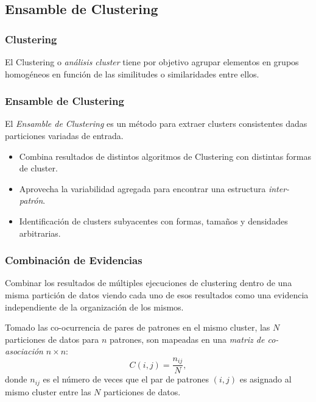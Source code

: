 \subsection{Ensamble de Clustering}
\begin{frame}
	\frametitle{Clustering}
	\centering
	El Clustering o \textit{análisis cluster} tiene por objetivo agrupar elementos en grupos homogéneos en función de las similitudes o similaridades entre ellos.
\end{frame}

\begin{frame}
	\frametitle{Ensamble de Clustering}
	\centering
	El \textit{Ensamble de Clustering} es un método para extraer clusters consistentes dadas particiones variadas de entrada.

 	\bigskip

	\begin{itemize}
		\item Combina resultados de distintos algoritmos de Clustering con distintas formas de cluster.
		\item Aprovecha la variabilidad agregada para encontrar una estructura \textit{inter-patrón}.
		\item Identificación de clusters subyacentes con formas, tamaños y densidades arbitrarias.
	\end{itemize}
\end{frame}

\begin{frame}
	\frametitle{Combinación de Evidencias}
	Combinar los resultados de múltiples ejecuciones de clustering dentro de una misma partición de datos viendo cada uno de esos resultados como una evidencia independiente de la organización de los mismos.

	\bigskip

	Tomado las co-ocurrencia de pares de patrones en el mismo cluster, las \(N\) particiones de datos para \(n\) patrones, son mapeadas en una \textit{matriz de co-asociación} \(n \times n\):
	\[C(i,j)=\frac{n_{ij}}{N},\]
	donde \(n_{ij}\) es el número de veces que el par de patrones \((i,j)\) es asignado al mismo cluster entre las \(N\) particiones de datos.
\end{frame}
